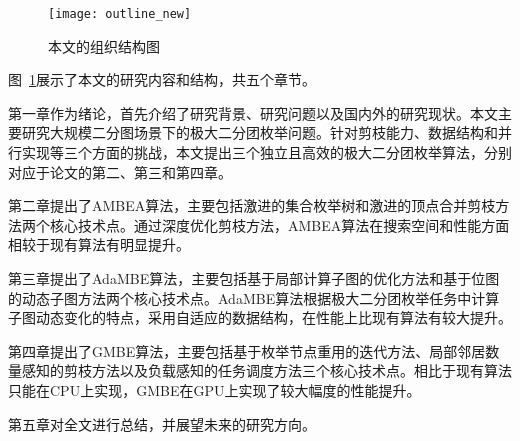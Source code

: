 \begin{figure} [ht]
  \centering
  \texttt{[image: outline\_new]}
  \caption{本文的组织结构图}
  \label{fig:outline}
\end{figure}


图~\ref{fig:outline}展示了本文的研究内容和结构，共五个章节。

第一章作为绪论，首先介绍了研究背景、研究问题以及国内外的研究现状。本文主要研究大规模二分图场景下的极大二分团枚举问题。针对剪枝能力、数据结构和并行实现等三个方面的挑战，本文提出三个独立且高效的极大二分团枚举算法，分别对应于论文的第二、第三和第四章。

第二章提出了AMBEA算法，主要包括激进的集合枚举树和激进的顶点合并剪枝方法两个核心技术点。通过深度优化剪枝方法，AMBEA算法在搜索空间和性能方面相较于现有算法有明显提升。

第三章提出了AdaMBE算法，主要包括基于局部计算子图的优化方法和基于位图的动态子图方法两个核心技术点。AdaMBE算法根据极大二分团枚举任务中计算子图动态变化的特点，采用自适应的数据结构，在性能上比现有算法有较大提升。

第四章提出了GMBE算法，主要包括基于枚举节点重用的迭代方法、局部邻居数量感知的剪枝方法以及负载感知的任务调度方法三个核心技术点。相比于现有算法只能在CPU上实现，GMBE在GPU上实现了较大幅度的性能提升。

第五章对全文进行总结，并展望未来的研究方向。















